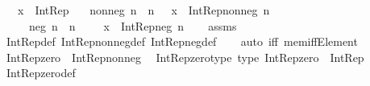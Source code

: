 \begin{isabellebody}
\ \ \ {\isachardoublequoteopen}x\ {\isacharcolon}{\kern0pt}\ Int{\isacharunderscore}{\kern0pt}Rep{\isachardoublequoteclose}\isanewline
\ \ \ {\isacharparenleft}{\kern0pt}nonneg{\isacharparenright}{\kern0pt}\ n\ \ {\isachardoublequoteopen}n\ {\isasymin}\ {\isasymnat}{\isachardoublequoteclose}\ {\isachardoublequoteopen}x\ {\isacharequal}{\kern0pt}\ Int{\isacharunderscore}{\kern0pt}Rep{\isacharunderscore}{\kern0pt}nonneg\ n{\isachardoublequoteclose}\isanewline
\ \ \ \ {\isacharbar}{\kern0pt}\ {\isacharparenleft}{\kern0pt}neg{\isacharparenright}{\kern0pt}\ n\ \ {\isachardoublequoteopen}n\ {\isasymin}\ {\isasymnat}\ {\isasymsetminus}\ {\isacharbraceleft}{\kern0pt}{}{\isacharbraceright}{\kern0pt}{\isachardoublequoteclose}\ {\isachardoublequoteopen}x\ {\isacharequal}{\kern0pt}\ Int{\isacharunderscore}{\kern0pt}Rep{\isacharunderscore}{\kern0pt}neg\ n{\isachardoublequoteclose}\isanewline
%
\isadelimproof
\ \ %
\endisadelimproof
%
\isatagproof
{}\isamarkupfalse%
\ assms\ \isamarkupfalse%
\ Int{\isacharunderscore}{\kern0pt}Rep{\isacharunderscore}{\kern0pt}def\ Int{\isacharunderscore}{\kern0pt}Rep{\isacharunderscore}{\kern0pt}nonneg{\isacharunderscore}{\kern0pt}def\ Int{\isacharunderscore}{\kern0pt}Rep{\isacharunderscore}{\kern0pt}neg{\isacharunderscore}{\kern0pt}def\isanewline
\ \ \isamarkupfalse%
\ {\isacharparenleft}{\kern0pt}auto\ iff{\isacharcolon}{\kern0pt}\ mem{\isacharunderscore}{\kern0pt}iff{\isacharunderscore}{\kern0pt}Element{\isacharparenright}{\kern0pt}%
\endisatagproof
{\isafoldproof}%
%
\isadelimproof
\isanewline
%
\endisadelimproof
\isanewline
{}\isamarkupfalse%
\ {\isachardoublequoteopen}Int{\isacharunderscore}{\kern0pt}Rep{\isacharunderscore}{\kern0pt}zero\ {\isasymequiv}\ Int{\isacharunderscore}{\kern0pt}Rep{\isacharunderscore}{\kern0pt}nonneg\ {}{\isachardoublequoteclose}\isanewline
\isanewline
{}\isamarkupfalse%
\ Int{\isacharunderscore}{\kern0pt}Rep{\isacharunderscore}{\kern0pt}zero{\isacharunderscore}{\kern0pt}type\ {\isacharbrackleft}{\kern0pt}type{\isacharbrackright}{\kern0pt}{\isacharcolon}{\kern0pt}\ {\isachardoublequoteopen}Int{\isacharunderscore}{\kern0pt}Rep{\isacharunderscore}{\kern0pt}zero\ {\isacharcolon}{\kern0pt}\ Int{\isacharunderscore}{\kern0pt}Rep{\isachardoublequoteclose}\isanewline
%
\isadelimproof
\ \ %
\endisadelimproof
%
\isatagproof
{}\isamarkupfalse%
\ Int{\isacharunderscore}{\kern0pt}Rep{\isacharunderscore}{\kern0pt}zero{\isacharunderscore}{\kern0pt}def\ \isamarkupfalse%

\end{isabellebody}
